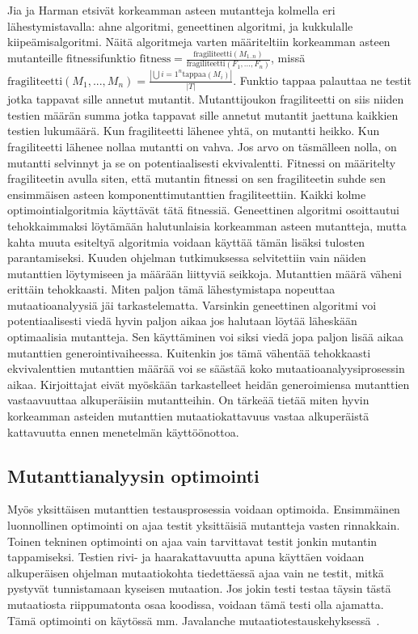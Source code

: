 \documentclass{tktltiki}
\begin{document}
Jia ja Harman etsivät korkeamman asteen mutantteja kolmella eri lähestymistavalla: ahne algoritmi, geneettinen algoritmi, ja kukkulalle kiipeämisalgoritmi. Näitä algoritmeja varten määriteltiin korkeamman asteen mutanteille fitnessifunktio $\text{fitness} = \frac{\text{fragiliteetti}({M_{1..n}})}{\text{fragiliteetti}({F_1, ..., F_n})}$, missä $\text{fragiliteetti}(M_1, ..., M_n) = \frac{|\bigcup{i=1}^{n} \text{tappaa}(M_i)|}{|T|}$. Funktio $\text{tappaa}$ palauttaa ne testit jotka tappavat sille annetut mutantit. Mutanttijoukon fragiliteetti on siis niiden testien määrän summa jotka tappavat sille annetut mutantit jaettuna kaikkien testien lukumäärä. Kun fragiliteetti lähenee yhtä, on mutantti heikko. Kun fragiliteetti lähenee nollaa mutantti on vahva. Jos arvo on täsmälleen nolla, on mutantti selvinnyt ja se on potentiaalisesti ekvivalentti. Fitnessi on määritelty fragiliteetin avulla siten, että mutantin fitnessi on sen fragiliteetin suhde sen ensimmäisen asteen komponenttimutanttien fragiliteettiin. Kaikki kolme optimointialgoritmia käyttävät tätä fitnessiä. Geneettinen algoritmi osoittautui tehokkaimmaksi löytämään halutunlaisia korkeamman asteen mutantteja, mutta kahta muuta esiteltyä algoritmia voidaan käyttää tämän lisäksi tulosten parantamiseksi. Kuuden ohjelman tutkimuksessa selvitettiin vain näiden mutanttien löytymiseen ja määrään liittyviä seikkoja. Mutanttien määrä väheni erittäin tehokkaasti. Miten paljon tämä lähestymistapa nopeuttaa mutaatioanalyysiä jäi tarkastelematta. Varsinkin geneettinen algoritmi voi potentiaalisesti viedä hyvin paljon aikaa jos halutaan löytää läheskään optimaalisia mutantteja. Sen käyttäminen voi siksi viedä jopa paljon lisää aikaa mutanttien generointivaiheessa. Kuitenkin jos tämä vähentää tehokkaasti ekvivalenttien mutanttien määrää voi se säästää koko mutaatioanalyysiprosessin aikaa. Kirjoittajat eivät myöskään tarkastelleet heidän generoimiensa mutanttien vastaavuuttaa alkuperäisiin mutantteihin. On tärkeää tietää miten hyvin korkeamman asteiden mutanttien mutaatiokattavuus vastaa alkuperäistä kattavuutta ennen menetelmän käyttöönottoa.

\subsection{Mutanttianalyysin optimointi}
Myös yksittäisen mutanttien testausprosessia voidaan optimoida. Ensimmäinen luonnollinen optimointi on ajaa testit yksittäisiä mutantteja vasten rinnakkain. Toinen tekninen optimointi on ajaa vain tarvittavat testit jonkin mutantin tappamiseksi. Testien rivi- ja haarakattavuutta apuna käyttäen voidaan alkuperäisen ohjelman mutaatiokohta tiedettäessä ajaa vain ne testit, mitkä pystyvät tunnistamaan kyseisen mutaation. Jos jokin testi testaa täysin tästä mutaatiosta riippumatonta osaa koodissa, voidaan tämä testi olla ajamatta. Tämä optimointi on käytössä mm. Javalanche mutaatiotestauskehyksessä~\cite{}.
\end{document}
